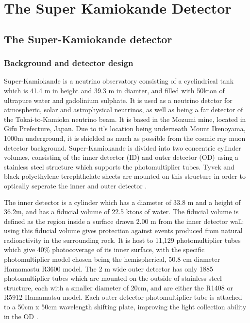 \chapter{The Super Kamiokande Detector}
\label{chp:superk}



\section{The Super-Kamiokande detector}

\subsection{Background and detector design}

Super-Kamiokande is a neutrino observatory consisting of a cyclindrical tank which is 41.4 m in height and 39.3 m in diamter, and filled with 50kton of ultrapure water and gadolinium sulphate. It is used as a neutrino detctor for atmospheric, solar and astrophysical neutrinos, as well as being a far detector of the Tokai-to-Kamioka neutrino beam. It is based in the Mozumi mine, located in Gifu Prefecture, Japan. Due to it's location being underneath Mount Ikenoyama, 1000m underground, it is shielded as much as possible from the cosmic ray muon detector background. Super-Kamiokande is divided into two concentric cylinder volumes, consisting of the inner detector (ID) and outer detector (OD) using a stainless steel structure which supports the photomultiplier tubes. Tyvek and black polyethylene terephthelate sheets are mounted on this structure in order to optically seperate the inner and outer detector \cite{suzukiSuperKamiokandeExperiment2019}.

The inner detector is a cylinder which has a diameter of 33.8 m and a height of 36.2m, and has a fiducial volume of 22.5 ktons of water. The fiducial volume is defined as the region inside a surface drawn 2.00 m from the inner detector wall: using this fiducial volume gives protection against events produced from natural radioactivity in the surrounding rock. It is host to 11,129 photomultiplier tubes which give 40\% photocoverage of its inner surface, with the specific photomultiplier model chosen being the hemispherical, 50.8 cm diameter Hamamastu R3600 model. The 2 m wide outer detector has only 1885 photomultiplier tubes which are mounted on the outside of stainless steel structure, each with a smaller diameter of 20cm, and are either the R1408 or R5912 Hamamatsu model. Each outer detector photomultiplier tube is attached to a 50cm x 50cm wavelength shifting plate, improving the light collection ability in the OD \cite{fukudaSuperKamiokandeDetector2003}.


